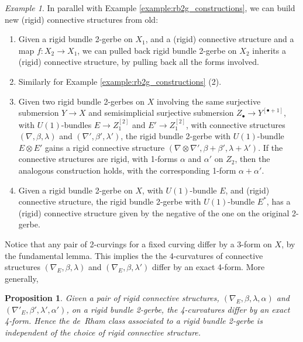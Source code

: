 \documentclass[12pt]{amsart}
\theoremstyle{plain}
\newtheorem{proposition}[theorem]{Proposition}
\theoremstyle{definition}
\theoremstyle{remark}
\newtheorem{example}[theorem]{Example}
\numberwithin{equation}{section}
\newcommand{\<}{\langle}
\renewcommand{\>}{\rangle}
\begin{document}
\begin{example}\label{example:conn_str_constructions}
In parallel with Example \ref{example:rb2g_constructions}, we can build new (rigid) connective structures from old:
\begin{enumerate}
\item
  Given a rigid bundle 2-gerbe on $X_1$, and a (rigid) connective structure and a map $f\colon X_2\to X_1$, we can pulled back rigid bundle 2-gerbe on $X_2$ inherits a (rigid) connective structure, by pulling back all the forms involved.
\item
  Similarly for Example \ref{example:rb2g_constructions} (2).
\item
  Given two rigid bundle 2-gerbes on $X$ involving the same surjective submersion $Y\to X$ and semisimplicial surjective submersion $Z_\bullet \to Y^{[\bullet+1]}$, with $U(1)$-bundles $E\to Z_1^{[2]}$ and $E'\to Z_1^{[2]}$, with connective structures $(\nabla,\beta,\lambda)$ and $(\nabla',\beta',\lambda')$, the rigid bundle 2-gerbe with $U(1)$-bundle $E\otimes E'$ gains a rigid connective structure $(\nabla\otimes \nabla',\beta+\beta',\lambda+\lambda')$. 
  If the connective structures are rigid, with 1-forms $\alpha$ and $\alpha'$ on $Z_2$, then the analogous construction holds, with the corresponding 1-form $\alpha+\alpha'$.
\item
  Given a rigid bundle 2-gerbe on $X$, with $U(1)$-bundle $E$, and (rigid) connective structure, the rigid bundle 2-gerbe with $U(1)$-bundle $E^*$, has a (rigid) connective structure given by the negative of the one on the original 2-gerbe.
\end{enumerate}
\end{example}

Notice that any pair of 2-curvings for a fixed curving differ by a 3-form on $X$, by the fundamental lemma.
This implies the the 4-curvatures of connective structures $(\nabla_E,\beta,\lambda)$ and $(\nabla_E,\beta,\lambda')$ differ by an exact 4-form.
More generally,


\begin{proposition}\label{prop:deRhamClass}
Given a pair of rigid connective structures, $(\nabla_E,\beta,\lambda,\alpha)$ and $(\nabla'_E,\beta',\lambda',\alpha')$, on a rigid bundle 2-gerbe, the 4-curvatures differ by an exact 4-form.
Hence the de~Rham class associated to a rigid bundle 2-gerbe is independent of the choice of rigid connective structure.
\end{proposition}
\end{document}
